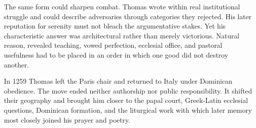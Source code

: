 The same form could sharpen combat.  Thomas wrote within real institutional
struggle and could describe adversaries through categories they rejected.  His
later reputation for serenity must not bleach the argumentative stakes.  Yet
his characteristic answer was architectural rather than merely victorious.
Natural reason, revealed teaching, vowed perfection, ecclesial office, and
pastoral usefulness had to be placed in an order in which one good did not
destroy another.

In 1259 Thomas left the Paris chair and returned to Italy under Dominican
obedience.  The move ended neither authorship nor public responsibility.  It
shifted their geography and brought him closer to the papal court, Greek-Latin
ecclesial questions, Dominican formation, and the liturgical work with which
later memory most closely joined his prayer and poetry.
